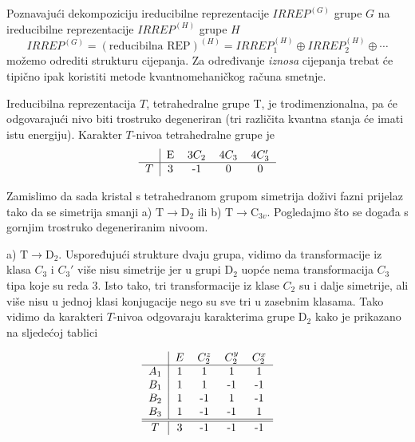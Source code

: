 \centerline{}
 
Poznavajući dekompoziciju ireducibilne reprezentacije $IRREP^{(G)}$
grupe $G$ na ireducibilne reprezentacije  $IRREP^{(H)}$ grupe $H$
\begin{displaymath}
   IRREP^{(G)}=(\text{reducibilna REP})^{(H)}=
 IRREP^{(H)}_1 \oplus IRREP^{(H)}_2 \oplus \cdots
\end{displaymath}
možemo odrediti strukturu cijepanja. Za određivanje \emph{iznosa} cijepanja
trebat će tipično ipak koristiti metode kvantnomehaničkog računa smetnje.

\begin{primjer}
Ireducibilna reprezentacija $T$, tetrahedralne grupe T, je
trodimenzionalna, pa će odgovarajući nivo biti trostruko degeneriran
(tri različita kvantna stanja će imati istu energiju).
Karakter $T$-nivoa tetrahedralne grupe je
\begin{displaymath}
\begin{tabular}{c|cccc}
  & E & 3$C_2$  & 4$C_3$ & 4$C_{3}'$ \\ \hline
 $T$ & 3  & -1 & 0 & 0 
\end{tabular}
\end{displaymath}

Zamislimo da sada kristal s tetrahedranom grupom simetrija doživi
fazni prijelaz tako da se
simetrija smanji a) $\mathrm{T}\to \mathrm{D}_2$ ili b) $\mathrm{T}\to
\mathrm{C}_{3v}$. Pogledajmo
što se događa s gornjim trostruko degeneriranim nivoom.

a) $\mathrm{T}\to \mathrm{D}_2$. Uspoređujući strukture dvaju grupa,
vidimo da transformacije iz klasa $C_3$ i $C_{3}'$ više nisu simetrije
jer u grupi $\mathrm{D}_2$ uopće nema transformacija $C_3$ tipa koje
su reda 3. Isto tako, tri transformacije iz klase $C_2$ su i dalje
simetrije, ali više nisu u jednoj klasi konjugacije nego su sve tri
u zasebnim klasama. Tako vidimo da karakteri $T$-nivoa odgovaraju
karakterima grupe D$_2$ kako je prikazano na sljedećoj tablici

\begin{displaymath}
\begin{tabular}{c|cccc}
 & $E$  & $C_{2}^z$ &  $C_{2}^y$ & $C_{2}^x$ \\ \hline
$A_1$ & 1 & 1& 1 & 1 \\
$B_1$ & 1 & 1&-1  & -1\\
$B_2$ & 1 & -1&1  & -1\\
$B_3$ & 1 & -1&-1  & 1\\ \hline \hline
 $T$ & 3 & -1 & -1 & -1
\end{tabular}
\end{displaymath}


\end{primjer}
